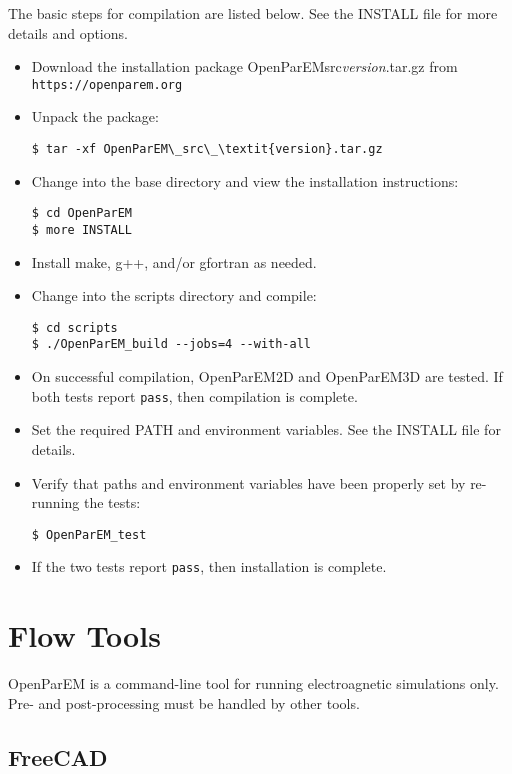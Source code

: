 \documentclass[titlepage]{article}
\renewcommand\_{\textunderscore\linebreak[1]}
\begin{document}
The basic steps for compilation are listed below.  See the INSTALL file for more details and options.
\begin{itemize}[nosep]
   \item Download the installation package OpenParEM\_src\_\textit{version}.tar.gz from \verb+https://openparem.org+
   \item Unpack the package:
         \begin{Verbatim}
$ tar -xf OpenParEM\_src\_\textit{version}.tar.gz
         \end{Verbatim}
   \item Change into the base directory and view the installation instructions:
         \begin{Verbatim}
$ cd OpenParEM
$ more INSTALL
         \end{Verbatim}
   \item Install make, g++, and/or gfortran as needed.
   \item Change into the scripts directory and compile:
         \begin{Verbatim}
$ cd scripts
$ ./OpenParEM_build --jobs=4 --with-all
         \end{Verbatim}
   \item On successful compilation, OpenParEM2D and OpenParEM3D are tested.  If both tests report \texttt{pass}, then compilation is complete.
   \item Set the required PATH and environment variables.  See the INSTALL file for details.
   \item Verify that paths and environment variables have been properly set by re-running the tests:
         \begin{Verbatim}
$ OpenParEM_test
         \end{Verbatim}
   \item If the two tests report \texttt{pass}, then installation is complete.
\end{itemize}

\section{Flow Tools}

OpenParEM is a command-line tool for running electroagnetic simulations only.  Pre- and post-processing must be handled by other tools.

\subsection{FreeCAD}
\label{sec:freecad}
\end{document}
